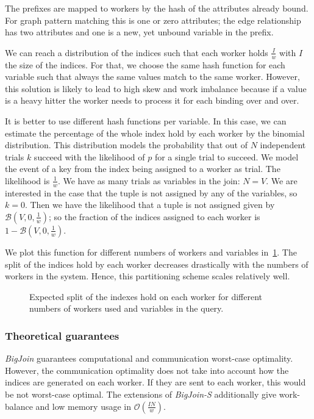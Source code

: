 The prefixes are mapped to workers by the hash of the attributes already bound.
For graph pattern matching this is one or zero attributes;
the edge relationship has two attributes and one is a new, yet unbound variable in the prefix.

We can reach a distribution of the indices such that each worker holds $\frac{I}{w}$ with $I$ the size of the indices.
For that, we choose the same hash function for each variable such that always the same values match to the same worker.
However, this solution is likely to lead to high skew and work imbalance because if a value is a heavy hitter the
worker needs to process it for each binding over and over.

It is better to use different hash functions per variable.
In this case, we can estimate the percentage of the whole index hold by each worker by the binomial distribution.
This distribution models the probability that out of $N$ independent trials $k$ succeed with the likelihood of $p$ for a single trial
to succeed.
We model the event of a key from the index being assigned to a worker as trial.
The likelihood is $\frac{1}{w}$.
We have as many trials as variables in the join: $N = V$.
We are interested in the case that the tuple is not assigned by any of the variables, so $k = 0$.
Then we have the likelihood that a tuple is not assigned given by $\mathcal{B} (V, 0, \frac{1}{w})$;
so the fraction of the indices assigned to each worker is $1 - \mathcal{B} (V, 0, \frac{1}{w})$.

We plot this function for different numbers of workers and variables in~\cref{fig:big-join-indices}.
The split of the indices hold by each worker decreases drastically with the numbers of workers in
the system.
Hence, this partitioning scheme scales relatively well.

\begin{figure}
    \centering
    
    \caption{Expected split of the indexes hold on each worker for different numbers of workers used
    and variables in the query.
    }
    \label{fig:big-join-indices}
\end{figure}

\subsubsection{Theoretical guarantees}
\textit{BigJoin} guarantees computational and communication worst-case optimality.
However, the communication optimality does not take into account how the indices are generated on each worker.
If they are sent to each worker, this would be not worst-case optimal.
The extensions of \textit{BigJoin-S} additionally give work-balance and low memory usage in $\mathcal{O} (\frac{IN}{w})$.

